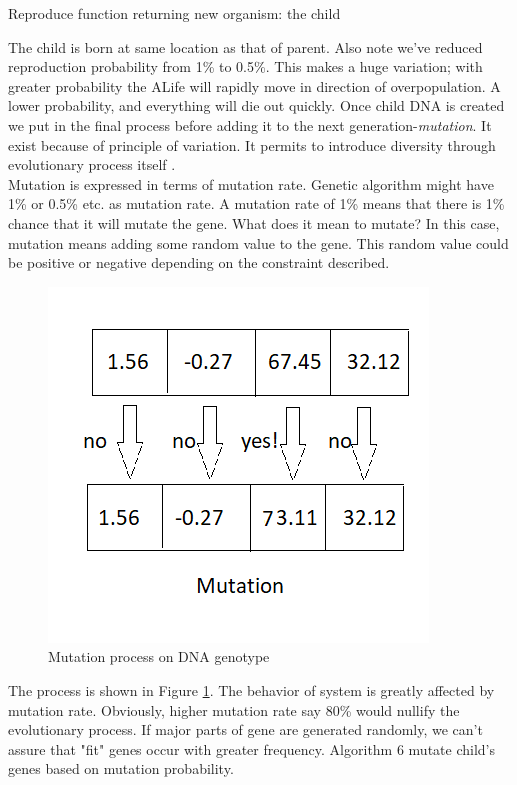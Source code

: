 \documentclass[conference]{IEEEtran}
\begin{document}
\begin{algorithm}
\caption{Reproduce function returning new organism: the child}
\begin{algorithmic} 
\ELSE
{}
\ENDIF
\end{algorithmic}
\end{algorithm}
The child is born at same location as that of parent. Also note we've reduced reproduction probability from 1\% to 0.5\%. This makes a huge variation; with greater probability the ALife will rapidly move in direction of overpopulation. A lower probability, and everything will die out quickly. Once child DNA is created we put in the final process before adding it to the next generation-\textit{mutation}. It exist because of principle of variation. It permits to introduce diversity through evolutionary process itself \cite{Stanley}.\\
Mutation is expressed in terms of mutation rate. Genetic algorithm might have 1\% or 0.5\% etc. as mutation rate. A mutation rate of 1\% means that there is 1\% chance that it will mutate the gene. What does it mean to mutate? In this case, mutation means adding some random value to the gene. This random value could be positive or negative depending on the constraint described.\\
\begin{figure}
	\includegraphics[scale=1]{mutation.png}
	\caption{Mutation process on DNA genotype}
	\label{fig:mutation}
\end{figure}
The process is shown in Figure \ref{fig:mutation}. The behavior of system is greatly affected by mutation rate. Obviously, higher mutation rate say 80\% would nullify the evolutionary process. If major parts of gene are generated randomly, we can't assure that "fit" genes occur with greater frequency. Algorithm 6 mutate child's genes based on mutation probability.
\end{document}
